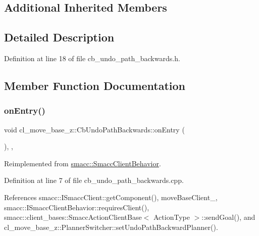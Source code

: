 \subsection*{Additional Inherited Members}


\subsection{Detailed Description}


Definition at line 18 of file cb\+\_\+undo\+\_\+path\+\_\+backwards.\+h.



\subsection{Member Function Documentation}
\mbox{\label{classcl__move__base__z_1_1CbUndoPathBackwards_a32e680530375b62c7053bf173f6b2b1b}} 
\subsubsection{\texorpdfstring{on\+Entry()}{onEntry()}}
{\footnotesize\ttfamily void cl\+\_\+move\+\_\+base\+\_\+z\+::\+Cb\+Undo\+Path\+Backwards\+::on\+Entry (\begin{DoxyParamCaption}{ }\end{DoxyParamCaption})\hspace{0.3cm}{\ttfamily [override]}, {\ttfamily [private]}, {\ttfamily [virtual]}}



Reimplemented from \hyperlink{classsmacc_1_1SmaccClientBehavior_ad5d3e1f1697c3cfe66c94cadba948493}{smacc\+::\+Smacc\+Client\+Behavior}.



Definition at line 7 of file cb\+\_\+undo\+\_\+path\+\_\+backwards.\+cpp.



References smacc\+::\+I\+Smacc\+Client\+::get\+Component(), move\+Base\+Client\+\_\+, smacc\+::\+I\+Smacc\+Client\+Behavior\+::requires\+Client(), smacc\+::client\+\_\+bases\+::\+Smacc\+Action\+Client\+Base$<$ Action\+Type $>$\+::send\+Goal(), and cl\+\_\+move\+\_\+base\+\_\+z\+::\+Planner\+Switcher\+::set\+Undo\+Path\+Backward\+Planner().


